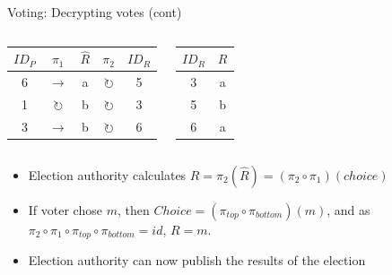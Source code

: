 \documentclass{beamer}
\begin{document}
\begin{frame}{Voting: Decrypting votes (cont)}
	\begin{columns}
		\begin{center}
			\begin{tabular}{|c|c|c|c|c|}
				\hline
				$ID_P$ & $\pi_1$ & $\hat{R}$ & $\pi_2$ & $ID_R$ \\
				\hline
				6 & $\rightarrow$       & a & $\circlearrowright$ & 5 \\
				1 & $\circlearrowright$ & b & $\circlearrowright$ & 3 \\
				3 & $\rightarrow$       & b & $\circlearrowright$ & 6 \\
				\hline
			\end{tabular}
		\end{center}
		\begin{center}
			\begin{tabular}{|c|c|}
				\hline
				$ID_R$ & $R$ \\
				\hline
				3 & a \\
				5 & b \\
				6 & a \\
				\hline
			\end{tabular}
		\end{center}
	\end{columns}

	\begin{itemize}
		\item Election authority calculates $R = \pi_2(\hat{R}) =
			(\pi_2 \circ \pi_1)(choice)$
		\item If voter chose $m$, then $Choice = (\pi_{top} \circ
			\pi_{bottom})(m)$, and as $\pi_{2} \circ \pi_{1}
			\circ \pi_{top} \circ \pi_{bottom} = id$, $R = m$.
		\item Election authority can now publish the results of the election
	\end{itemize}
\end{frame}
\end{document}
